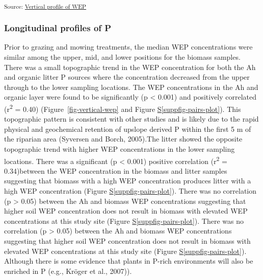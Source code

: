 \documentclass[
]{agujournal2019}
\newcommand*\quartosuppfigref[1]{Figure \hyperref[#1]{S\ref{#1}}}
\begin{document}
\textsubscript{Source:
\href{https://alex-koiter.github.io/riparian-grazing-manuscript/notebooks/04_Vertical_profile-preview.html\#cell-fig-vertical-WEP}{Vertical
profile of WEP}}

\subsubsection{Longitudinal profiles of
P}\label{longitudinal-profiles-of-p}

Prior to grazing and mowing treatments, the median WEP concentrations
were similar among the upper, mid, and lower positions for the biomass
samples. There was a small topographic trend in the WEP concentration
for both the Ah and organic litter P sources where the concentration
decreased from the upper through to the lower sampling locations. The
WEP concentrations in the Ah and organic layer were found to be
significantly (p \textless{} 0.001) and positively correlated
(r\textsuperscript{2} = 0.40) (Figure~\ref{fig-vertical-wep} and
\quartosuppfigref{suppfig-pairs-plot}). This topographic pattern is
consistent with other studies and is likely due to the rapid physical
and geochemical retention of upslope derived P within the first 5 m of
the riparian area (Syversen and Borch, 2005).The litter showed the
opposite topographic trend with higher WEP concentrations in the lower
sampling locations. There was a significant (p \textless{} 0.001)
positive correlation (r\textsuperscript{2} = 0.34)between the WEP
concentration in the biomass and litter samples suggesting that biomass
with a high WEP concentration produces litter with a high WEP
concentration (\quartosuppfigref{suppfig-pairs-plot}). There was no
correlation (p \textgreater{} 0.05) between the Ah and biomass WEP
concentrations suggesting that higher soil WEP concentration does not
result in biomass with elevated WEP concentrations at this study site
(\quartosuppfigref{suppfig-pairs-plot}). There was no correlation (p
\textgreater{} 0.05) between the Ah and biomass WEP concentrations
suggesting that higher soil WEP concentration does not result in biomass
with elevated WEP concentrations at this study site
(\quartosuppfigref{suppfig-pairs-plot}). Although there is some evidence
that plants in P-rich environments will also be enriched in P (e.g.,
Kröger et al., 2007)).
\end{document}
